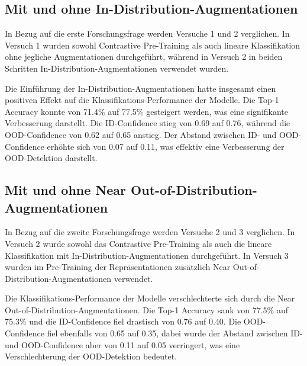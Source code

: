 \subsection{Mit und ohne In-Distribution-Augmentationen} \label{subsec:results-comparison-id}

In Bezug auf die erste Forschungsfrage werden Versuche 1 und 2 verglichen. In Versuch 1 wurden sowohl Contrastive Pre-Training als auch lineare Klassifikation ohne jegliche Augmentationen durchgeführt, während in Versuch 2 in beiden Schritten In-Distribution-Augmentationen verwendet wurden.

Die Einführung der In-Distribution-Augmentationen hatte insgesamt einen positiven Effekt auf die Klassifikations-Performance der Modelle. Die Top-1 Accuracy konnte von 71.4\% auf 77.5\% gesteigert werden, was eine signifikante Verbesserung darstellt. Die ID-Confidence stieg von 0.69 auf 0.76, während die OOD-Confidence von 0.62 auf 0.65 anstieg. Der Abstand zwischen ID- und OOD-Confidence erhöhte sich von 0.07 auf 0.11, was effektiv eine Verbesserung der OOD-Detektion darstellt.

\subsection{Mit und ohne Near Out-of-Distribution-Augmentationen} \label{subsec:results-comparison-ood}

In Bezug auf die zweite Forschungsfrage werden Versuche 2 und 3 verglichen. In Versuch 2 wurde sowohl das Contrastive Pre-Training als auch die lineare Klassifikation mit In-Distribution-Augmentationen durchgeführt. In Versuch 3 wurden im Pre-Training der Repräsentationen zusätzlich Near Out-of-Distribution-Augmentationen verwendet.

Die Klassifikations-Performance der Modelle verschlechterte sich durch die Near Out-of-Distribution-Augmentationen. Die Top-1 Accuracy sank von 77.5\% auf 75.3\% und die ID-Confidence fiel drastisch von 0.76 auf 0.40. Die OOD-Confidence fiel ebenfalls von 0.65 auf 0.35, dabei wurde der Abstand zwischen ID- und OOD-Confidence aber von 0.11 auf 0.05 verringert, was eine Verschlechterung der OOD-Detektion bedeutet.